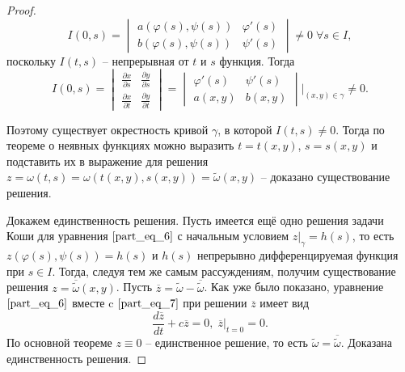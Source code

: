 \begin{proof}
    \begin{equation*}
        I(0, s) = 
        \begin{vmatrix}
            a(\varphi(s), \psi(s)) & \varphi'(s) \\
            b(\varphi(s), \psi(s)) & \psi'(s)
        \end{vmatrix} \neq 0 \; \forall s \in I,
    \end{equation*}
    поскольку $I(t, s)$ -- непрерывная от $t$ и $s$ функция. Тогда
    \begin{equation*}
        I(0, s) =
        \begin{vmatrix}
            \frac{\partial x}{\partial s} & \frac{\partial y}{\partial s} \\
            \frac{\partial x}{\partial t} & \frac{\partial y}{\partial t}
        \end{vmatrix} =
        \begin{vmatrix}
            \varphi'(s) & \psi'(s) \\
            a(x, y) & b(x, y)
        \end{vmatrix} \bigg|_{(x, y) \in \gamma} \neq 0.
    \end{equation*}

    Поэтому существует окрестность кривой $\gamma$, в которой $I(t, s) \neq 0$. Тогда по теореме о неявных функциях можно выразить $t = t(x, y)$, $s = s(x, y)$ и подставить их в выражение для решения $z = \omega(t, s) = \omega(t(x, y), s(x, y)) = \widetilde{\omega}(x, y)$ -- доказано существование решения.

    Докажем единственность решения. Пусть имеется ещё одно решения задачи Коши для уравнения $\eqref{part_eq_6}$ с начальным условием $z \big|_{\gamma} = h(s)$, то есть $z(\varphi(s), \psi(s)) = h(s)$ и $h(s)$ непрерывно дифференцируемая функция при $s \in I$. Тогда, следуя тем же самым рассуждениям, получим существование решения $z = \overline{\widetilde{\omega}}(x, y)$. Пусть $\overline{z} = \widetilde{\omega} - \overline{\widetilde{\omega}}$. Как уже было показано, уравнение $\eqref{part_eq_6}$ вместе c $\eqref{part_eq_7}$ при решении $\overline{z}$ имеет вид
    \begin{equation*}
        \frac{d \overline{z}}{dt} + c \overline{z} = 0, \; \overline{z} \big|_{t = 0} = 0.
    \end{equation*}
    По основной теореме $z \equiv 0$ -- единственное решение, то есть $\widetilde{\omega} = \overline{\widetilde{\omega}}$. Доказана единственность решения.

\end{proof}

